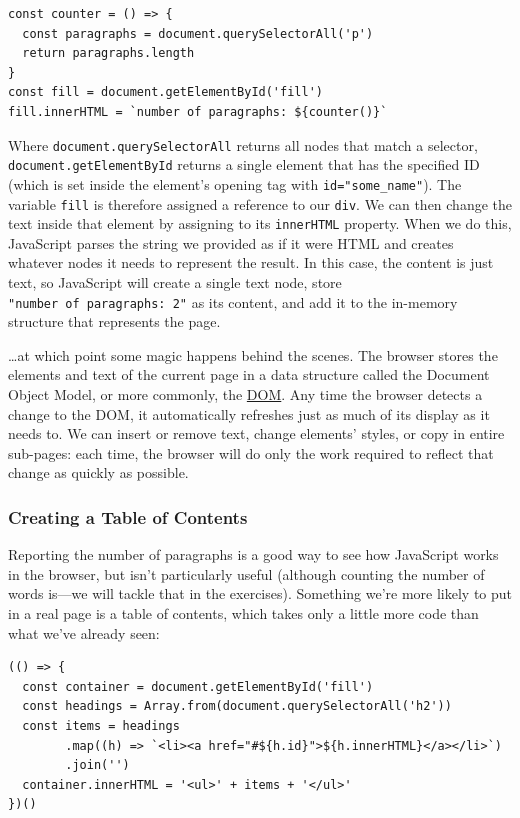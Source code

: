 \begin{verbatim}
const counter = () => {
  const paragraphs = document.querySelectorAll('p')
  return paragraphs.length
}
const fill = document.getElementById('fill')
fill.innerHTML = `number of paragraphs: ${counter()}`
\end{verbatim}

Where \texttt{document.querySelectorAll} returns all nodes that match a
selector, \texttt{document.getElementById} returns a single element that
has the specified ID (which is set inside the element's opening tag with
\texttt{id="some\_name"}). The variable \texttt{fill} is therefore
assigned a reference to our \texttt{div}. We can then change the text
inside that element by assigning to its \texttt{innerHTML} property.
When we do this, JavaScript parses the string we provided as if it were
HTML and creates whatever nodes it needs to represent the result. In
this case, the content is just text, so JavaScript will create a single
text node, store \texttt{"number\ of\ paragraphs:\ 2"} as its content,
and add it to the in-memory structure that represents the page.

\ldots{}at which point some magic happens behind the scenes. The browser
stores the elements and text of the current page in a data structure
called the Document Object Model, or more commonly, the
\protect\hyperlink{g:dom}{DOM}. Any time the browser detects a change to
the DOM, it automatically refreshes just as much of its display as it
needs to. We can insert or remove text, change elements' styles, or copy
in entire sub-pages: each time, the browser will do only the work
required to reflect that change as quickly as possible.

\subsubsection{Creating a Table of Contents}\label{s:pages-toc}

Reporting the number of paragraphs is a good way to see how JavaScript
works in the browser, but isn't particularly useful (although counting
the number of words is---we will tackle that in the exercises).
Something we're more likely to put in a real page is a table of
contents, which takes only a little more code than what we've already
seen:

\begin{verbatim}
(() => {
  const container = document.getElementById('fill')
  const headings = Array.from(document.querySelectorAll('h2'))
  const items = headings
        .map((h) => `<li><a href="#${h.id}">${h.innerHTML}</a></li>`)
        .join('')
  container.innerHTML = '<ul>' + items + '</ul>'
})()
\end{verbatim}

